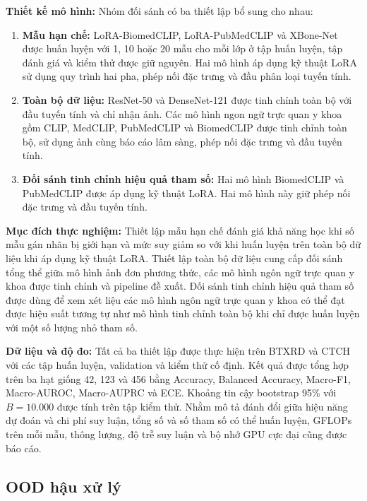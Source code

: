 \textbf{Thiết kế mô hình:} Nhóm đối sánh có ba thiết lập bổ sung cho nhau:
\begin{enumerate}
    \item \textbf{Mẫu hạn chế:} LoRA-BiomedCLIP, LoRA-PubMedCLIP và XBone-Net được huấn luyện với 1, 10 hoặc 20 mẫu cho mỗi lớp ở tập huấn luyện, tập đánh giá và kiểm thử được giữ nguyên. Hai mô hình áp dụng kỹ thuật LoRA sử dụng quy trình hai pha, phép nối đặc trưng và đầu phân loại tuyến tính.
    \item \textbf{Toàn bộ dữ liệu:} ResNet-50 và DenseNet-121 được tinh chỉnh toàn bộ với đầu tuyến tính và chỉ nhận ảnh. Các mô hình ngon ngữ trực quan y khoa gồm CLIP, MedCLIP, PubMedCLIP và BiomedCLIP được tinh chỉnh toàn bộ, sử dụng ảnh cùng báo cáo lâm sàng, phép nối đặc trưng và đầu tuyến tính.
    \item \textbf{Đối sánh tinh chỉnh hiệu quả tham số:} Hai mô hình BiomedCLIP và PubMedCLIP được áp dụng kỹ thuật LoRA. Hai mô hình này giữ phép nối đặc trưng và đầu tuyến tính.
\end{enumerate}

\textbf{Mục đích thực nghiệm:} Thiết lập mẫu hạn chế đánh giá khả năng học khi số mẫu gán nhãn bị giới hạn và mức suy giảm so với khi huấn luyện trên toàn bộ dữ liệu khi áp dụng kỹ thuật LoRA. Thiết lập toàn bộ dữ liệu cung cấp đối sánh tổng thể giữa mô hình ảnh đơn phương thức, các mô hình ngôn ngữ trực quan y khoa được tinh chỉnh và pipeline đề xuất. Đối sánh tinh chỉnh hiệu quả tham số được dùng để xem xét liệu các mô hình ngôn ngữ trực quan y khoa có thể đạt được hiệu suất tương tự như mô hình tinh chỉnh toàn bộ khi chỉ được huấn luyện với một số lượng nhỏ tham số.

\textbf{Dữ liệu và độ đo:} Tất cả ba thiết lập được thực hiện trên BTXRD và CTCH với các tập huấn luyện, validation và kiểm thử cố định. Kết quả được tổng hợp trên ba hạt giống 42, 123 và 456 bằng Accuracy, Balanced Accuracy, Macro-F1, Macro-AUROC, Macro-AUPRC và ECE. Khoảng tin cậy bootstrap 95\% với $B=10.000$ được tính trên tập kiểm thử. Nhằm mô tả đánh đổi giữa hiệu năng dự đoán và chi phí suy luận, tổng số và số tham số có thể huấn luyện, GFLOPs trên mỗi mẫu, thông lượng, độ trễ suy luận và bộ nhớ GPU cực đại cũng được báo cáo.

\subsection{OOD hậu xử lý}
\label{subsec:ood_postprocessing}

